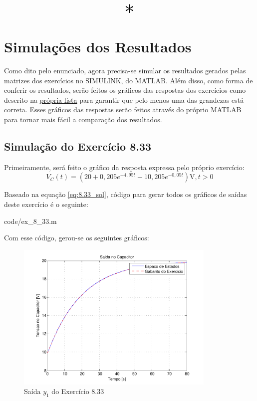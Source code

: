 \documentclass{report}
\let\oldsection\section
\renewcommand\section{\clearpage\oldsection}
\begin{document}
\begin{center}
      \[ \scalebox{3}{$ * $} \]
\end{center}

\section{Simulações dos Resultados}
Como dito pelo enunciado, agora precisa-se simular os resultados gerados pelas matrizes dos exercícios no SIMULINK, do MATLAB. Além disso, como forma de conferir os resultados,
serão feitos os gráficos das respostas dos exercícios como descrito na \href{https://www.ece.ufrgs.br/~fetter/eng10001/listas/circuitos_2a_ordem.pdf}{própria lista} para garantir que pelo menos uma das grandezas está correta. Esses gráficos das respostas
serão feitos através do próprio MATLAB para tornar mais fácil a comparação dos resultados.

\subsection{Simulação do Exercício 8.33}
Primeiramente, será feito o gráfico da resposta expressa pelo próprio exercício:
$$ V_C(t) = \left(20 + 0,\!205e^{-4,95t} - 10,\!205e^{-0,05t}\right)\text{V}, t > 0 $$

Baseado na equação \ref{eq:8.33_sol}, código para gerar todos os gráficos de saídas deste exercício é o seguinte:

                {code/ex_8_33.m}

Com esse código, gerou-se os seguintes gráficos:
\begin{figure}[h!]
    \centering
    \includegraphics[width=0.85\textwidth]{images/plots/plot_8_33_y1.pdf}
    \caption{\label{plot:8.33_y1} Saída $ y_1 $ do Exercício 8.33}
\end{figure}
\end{document}
